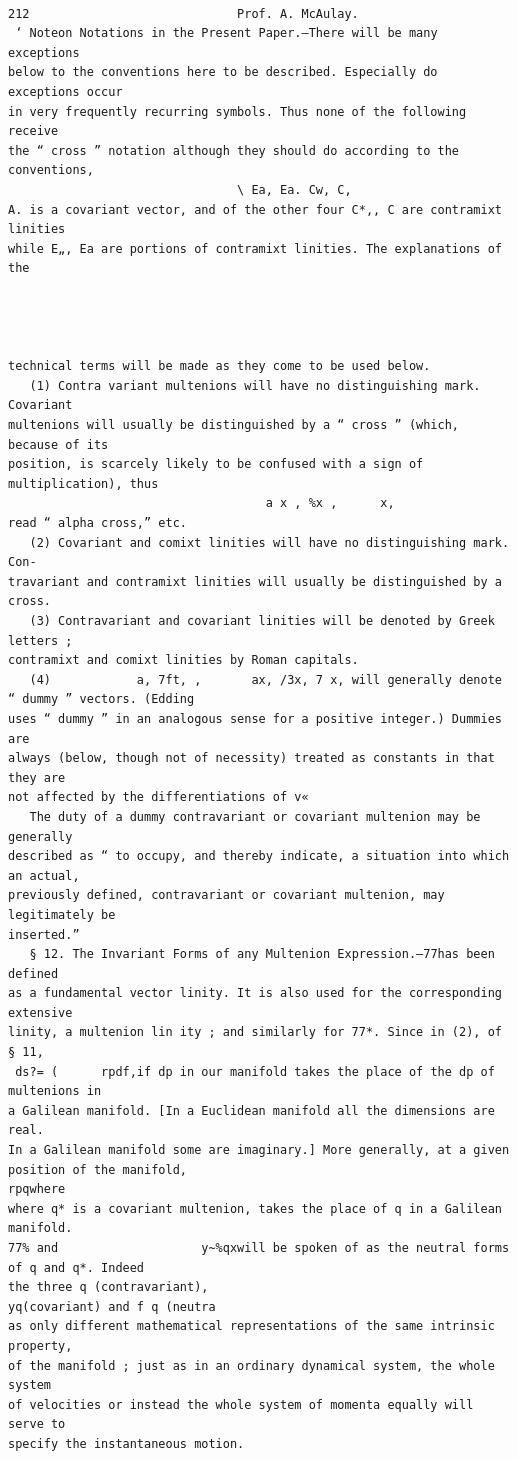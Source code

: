 \documentclass[10pt]{article}
\begin{document}
\clearpage
\begin{verbatim}

212                             Prof. A. McAulay.
 ‘ Noteon Notations in the Present Paper.—There will be many exceptions
below to the conventions here to be described. Especially do exceptions occur
in very frequently recurring symbols. Thus none of the following receive
the “ cross ” notation although they should do according to the conventions,
                                \ Ea, Ea. Cw, C,
A. is a covariant vector, and of the other four C*,, C are contramixt linities
while E„, Ea are portions of contramixt linities. The explanations of the




technical terms will be made as they come to be used below.
   (1) Contra variant multenions will have no distinguishing mark. Covariant
multenions will usually be distinguished by a “ cross ” (which, because of its
position, is scarcely likely to be confused with a sign of multiplication), thus
                                    a x , %x ,      x,
read “ alpha cross,” etc.
   (2) Covariant and comixt linities will have no distinguishing mark. Con-
travariant and contramixt linities will usually be distinguished by a cross.
   (3) Contravariant and covariant linities will be denoted by Greek letters ;
contramixt and comixt linities by Roman capitals.
   (4)            a, 7ft, ,       ax, /3x, 7 x, will generally denote “ dummy ” vectors. (Edding
uses “ dummy ” in an analogous sense for a positive integer.) Dummies are
always (below, though not of necessity) treated as constants in that they are
not affected by the differentiations of v«
   The duty of a dummy contravariant or covariant multenion may be generally
described as “ to occupy, and thereby indicate, a situation into which an actual,
previously defined, contravariant or covariant multenion, may legitimately be
inserted.”
   § 12. The Invariant Forms of any Multenion Expression.—77has been defined
as a fundamental vector linity. It is also used for the corresponding extensive
linity, a multenion lin ity ; and similarly for 77*. Since in (2), of § 11,
 ds?= (      rpdf,if dp in our manifold takes the place of the dp of multenions in
a Galilean manifold. [In a Euclidean manifold all the dimensions are real.
In a Galilean manifold some are imaginary.] More generally, at a given
position of the manifold,                                         rpqwhere
where q* is a covariant multenion, takes the place of q in a Galilean manifold.
77% and                    y~%qxwill be spoken of as the neutral forms of q and q*. Indeed
the three q (contravariant),                                          yq(covariant) and f q (neutra
as only different mathematical representations of the same intrinsic property,
of the manifold ; just as in an ordinary dynamical system, the whole system
of velocities or instead the whole system of momenta equally will serve to
specify the instantaneous motion.


\end{verbatim}
\end{document}
